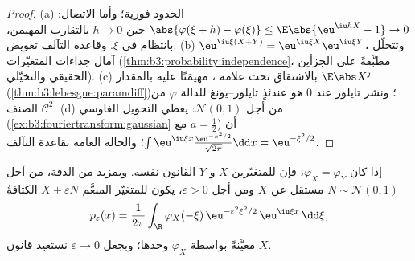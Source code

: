 \begin{proof}
(a) الحدود فورية؛ وأما الاتصال: $\abs{\varphi(\xi + h)
- \varphi(\xi)} \leq \E\abs{\eu^{\iu hX} - 1} \to 0$ حين $h
\to 0$ بالتقارب
المهيمن، بانتظام في $\xi$. وقاعدة التآلف تعويض. (b) $\eu^{\iu\xi(X+Y)} =
\eu^{\iu\xi X}\eu^{\iu\xi Y}$،
وتتحلّل آمال جداءات المتغيّرات  (\cref{thm:b3:probability:independence}، مطبَّقةً
على الجزأين الحقيقي والتخيّلي). (c) بالاشتقاق تحت علامة ،
مهيمَنًا عليه بالمقدار $\E\abs X^j$ (\cref{thm:b3:lebesgue:paramdiff})؛ ونشر تايلور
عند $0$ هو عندئذٍ تايلور--يونغ للدالة $\varphi$ من الصنف
$\mathcal C^2$. (d) من أجل $\mathcal N(0,1)$: يعطي التحويل الغاوسي
(\cref{ex:b3:fouriertransform:gaussian} مع $a = \frac12$) أن $\int\eu^{\iu\xi x}\frac{\eu^{-x^2/2}}{\sqrt{2\pi}}\dd
x = \eu^{-\xi^2/2}$؛ والحالة العامة بقاعدة
التآلف.
\end{proof}

\begin{theorem}[التباين]\label{thm:b3:clt:injectivity}
إذا كان $\varphi_X = \varphi_Y$، فإن للمتغيّرين $X$ و $Y$ القانون نفسه. وبمزيد من
الدقة، من أجل $N \sim \mathcal N(0,1)$ مستقل عن $X$ ومن أجل $\varepsilon > 0$، يكون
للمتغيّر المنعَّم $X +
\varepsilon N$ الكثافةُ
\[
p_\varepsilon(x) = \frac1{2\pi}\int_\R
\varphi_X(-\xi)\,\eu^{-\varepsilon^2\xi^2/2}\,
\eu^{\iu\xi x}\,\dd\xi ,
\]
معيَّنةً بواسطة $\varphi_X$ وحدها؛ وبجعل $\varepsilon \to 0$ نستعيد قانون
$X$.
\end{theorem}

